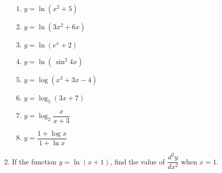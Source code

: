\documentclass[12pt]{report}
\begin{document}
\begin{enumerate}
          \begin{enumerate}
              \item $y=\ln\left(x^{2}+5\right)$
              \item $y=\ln\left(3x^{2}+6x\right)$
              \item $y=\ln\left(e^{x}+2\right)$
              \item $y=\ln\left(\,\sin^{2}4x\right)$
              \item $y=\log\left(x^{3}+3x-4\right)$
              \item $y=\log_{5}\left(3x+7\right)$
              \item $y=\log_{2}{\dfrac{x}{x+3}}$
              \item $y={\dfrac{1+\log x}{1+\ln x}}$
          \end{enumerate}
    \item If the function $y = \ln(x+1)$, find the value of $\dfrac{d^2y}{dx^2}$ when $x
              = 1$.
\end{enumerate}
\end{document}
